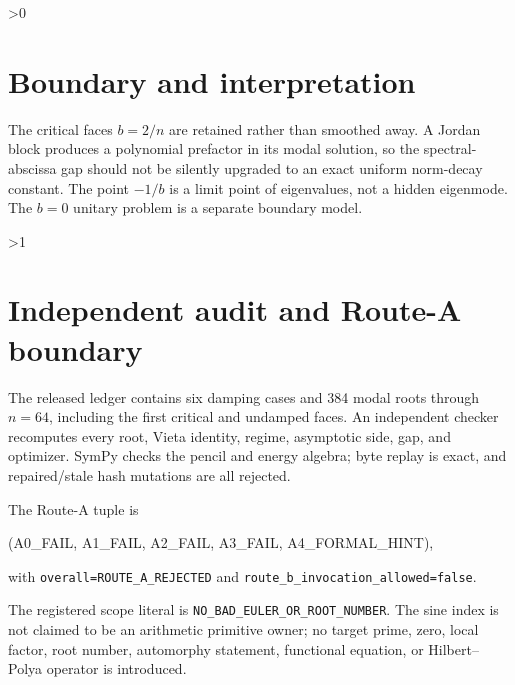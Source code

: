 \documentclass[11pt]{article}
\begin{document}
\ifnum\CRevisionRound>0
\section{Boundary and interpretation}
The critical faces \(b=2/n\) are retained rather than smoothed away.  A
Jordan block produces a polynomial prefactor in its modal solution, so the
spectral-abscissa gap should not be silently upgraded to an exact uniform
norm-decay constant.  The point \(-1/b\) is a limit point of eigenvalues, not a
hidden eigenmode.  The \(b=0\) unitary problem is a separate boundary model.
\fi

\ifnum\CRevisionRound>1
\section{Independent audit and Route-A boundary}
The released ledger contains six damping cases and 384 modal roots through
\(n=64\), including the first critical and undamped faces.  An independent
checker recomputes every root, Vieta identity, regime, asymptotic side, gap,
and optimizer.  SymPy checks the pencil and energy algebra; byte replay is
exact, and repaired/stale hash mutations are all rejected.

The Route-A tuple is
\begin{center}\ttfamily
(A0\_FAIL, A1\_FAIL, A2\_FAIL, A3\_FAIL, A4\_FORMAL\_HINT),
\end{center}
with \texttt{overall=ROUTE\_A\_REJECTED} and
\texttt{route\_b\_invocation\_allowed=false}.

\small The registered scope literal is
\texttt{NO\_BAD\_EULER\_OR\_ROOT\_NUMBER}.  The sine index is not claimed to be
an arithmetic primitive owner; no target prime, zero, local factor, root
number, automorphy statement, functional equation, or Hilbert--Polya
operator is introduced.
\fi
\end{document}
